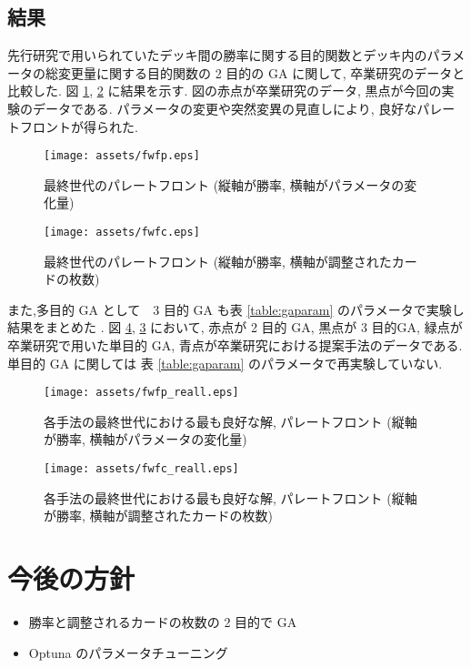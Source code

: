 \documentclass{jarticle}     %
\begin{document}
\subsection{結果}
先行研究で用いられていたデッキ間の勝率に関する目的関数とデッキ内のパラメータの総変更量に関する目的関数の 2 目的の GA に関して, 卒業研究のデータと比較した.
図 \ref{fig:fwfp}, \ref{fig:fwfc} に結果を示す. 図の赤点が卒業研究のデータ, 黒点が今回の実験のデータである.
パラメータの変更や突然変異の見直しにより, 良好なパレートフロントが得られた. 

\begin{figure}[ht]
  \centering
  \texttt{[image: assets/fwfp.eps]}
  \vspace{-0.3cm}
  \caption{最終世代のパレートフロント (縦軸が勝率, 横軸がパラメータの変化量)}
  \label{fig:fwfp}
\end{figure}

\begin{figure}[ht]
  \centering
  \texttt{[image: assets/fwfc.eps]}
  \vspace{-0.3cm}
  \caption{最終世代のパレートフロント (縦軸が勝率, 横軸が調整されたカードの枚数)}
  \label{fig:fwfc}
\end{figure}

また,多目的 GA として　3 目的 GA も表 \ref{table:gaparam} のパラメータで実験し結果をまとめた .
図 \ref{fig:fwfc_reall}, \ref{fig:fwfp_reall} において, 赤点が 2 目的 GA, 黒点が 3 目的GA, 緑点が卒業研究で用いた単目的 GA, 青点が卒業研究における提案手法のデータである. 
単目的 GA に関しては 表 \ref{table:gaparam} のパラメータで再実験していない.

\begin{figure}[ht]
  \centering
  \texttt{[image: assets/fwfp\_reall.eps]}
  \vspace{-0.3cm}
  \caption{各手法の最終世代における最も良好な解, パレートフロント (縦軸が勝率, 横軸がパラメータの変化量)}
  \label{fig:fwfp_reall}
\end{figure}

\begin{figure}[ht]
  \centering
  \texttt{[image: assets/fwfc\_reall.eps]}
  \vspace{-0.3cm}
  \caption{各手法の最終世代における最も良好な解, パレートフロント (縦軸が勝率, 横軸が調整されたカードの枚数)}
  \label{fig:fwfc_reall}
\end{figure}



\section{今後の方針}
\begin{itemize}
  \item 勝率と調整されるカードの枚数の 2 目的で GA
  \item Optuna のパラメータチューニング
\end{itemize}



\end{document}
